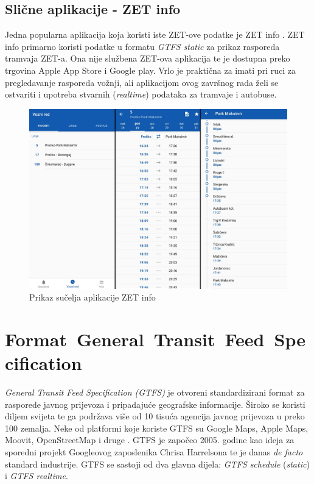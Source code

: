 \documentclass[zavrsnirad]{fer}
\begin{document}
\section{Slične aplikacije - ZET info}
Jedna popularna aplikacija koja koristi iste ZET-ove podatke je ZET info \cite{ZET-info}. ZET info primarno koristi podatke u formatu \textit{GTFS static} za prikaz rasporeda tramvaja ZET-a. Ona nije službena ZET-ova aplikacija te je dostupna preko trgovina Apple App Store i Google play. Vrlo je praktična za imati pri ruci za pregledavanje rasporeda vožnji, ali aplikacijom ovog završnog rada želi se ostvariti i upotreba stvarnih (\textit{realtime}) podataka za tramvaje i autobuse.

\begin{figure}[H]
	\centering
	\includegraphics[width=0.9\linewidth]{Figures/zetinfo.png} 
	\caption{Prikaz sučelja aplikacije ZET info}
	\label{slk:zet-info}
\end{figure}

\newpage
\chapter{\mbox{Format General Transit Feed Specification}}
\label{sec:GTFS}

\textit{General Transit Feed Specification (GTFS)} je otvoreni standardizirani format za rasporede
javnog prijevoza i pripadajuće geografske informacije. Široko se koristi diljem svijeta te ga
podržava više od 10 tisuća agencija javnog prijevoza u preko 100 zemalja. Neke od platformi koje
koriste GTFS su Google Maps, Apple Maps, Moovit, OpenStreetMap i druge \cite{GTFS}. GTFS je započeo 2005. godine kao ideja za sporedni projekt Googleovog zaposlenika Chrisa Harrelsona te je danas \textit{de facto} standard industrije. GTFS se sastoji od dva glavna dijela: \textit{GTFS schedule} (\textit{static}) i \textit{GTFS realtime}.
\end{document}
